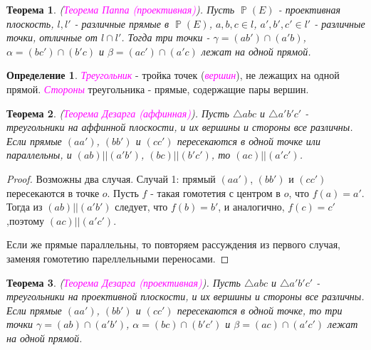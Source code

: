 \documentclass[a4paper,100pt]{article}
\theoremstyle{indented}
\newtheorem{theorem}{Теорема}
\theoremstyle{definition}
\newtheorem{defn}{Определение}
\theoremstyle{remark}
\DeclareMathOperator{\PP}{\mathbb{P}}
\begin{document}
\begin{theorem}
    (\textit{\textcolor{magenta}{\hypertarget{s47}{Теорема Паппа (проективная)}}}). Пусть $\PP(E)$ - проективная плоскость, $l, l'$ - различные прямые в $\PP(E)$, $a, b, c\in l$, $a', b', c'\in l'$ - различные точки, отличные от $l \cap l'$. Тогда три точки - $\gamma = (ab')\cap(a'b)$, $\alpha=(bc')\cap (b'c)$ и $\beta = (ac')\cap (a'c)$ лежат на одной прямой.
\end{theorem}

\begin{defn}
    \textit{\textcolor{magenta}{\hypertarget{s48}{Треугольник}}} - тройка точек (\textit{\textcolor{magenta}{\hypertarget{s49}{вершин}}}), не лежащих на одной прямой. \textit{\textcolor{magenta}{\hypertarget{s50}{Стороны}}} треугольника - прямые, содержащие пары вершин.
\end{defn}

\begin{theorem}
    (\textit{\textcolor{magenta}{\hypertarget{s51}{Теорема Дезарга (аффинная)}}}). Пусть $\triangle abc$ и $\triangle a'b'c'$ - треугольники на аффинной плоскости, и их вершины и стороны все различны. Если прямые $(aa')$, $(bb')$ и $(cc')$ пересекаются в одной точке или параллельны, и $(ab)||(a'b')$, $(bc)||(b'c')$, то $(ac)||(a'c')$. 
\end{theorem} 

\begin{proof}
    Возможны два случая. Случай 1: прямый $(aa')$, $(bb')$ и $(cc')$ пересекаются в точке $o$. Пусть $f$ - такая гомотетия с центром в $o$, что $f(a) = a'$. Тогда из $(ab) || (a'b')$ следует, что $f(b) = b'$, и аналогично, $f(c) = c'$,поэтому $(ac) || (a'c')$. \ 

    Если же прямые параллельны, то повторяем рассуждения из первого случая, заменяя гомотетию пареллельными переносами.
\end{proof}

\begin{theorem}
    (\textit{\textcolor{magenta}{\hypertarget{s52}{Теорема Дезарга (проективная)}}}). Пусть $\triangle abc$ и $\triangle a'b'c'$ - треугольники на проективной плоскости, и их вершины и стороны все различны. Если прямые $(aa')$, $(bb')$ и $(cc')$ пересекаются в одной точке, то три точки $\gamma = (ab)\cap (a'b')$, $\alpha = (bc)\cap (b'c')$ и $\beta = (ac)\cap (a'c')$ лежат на одной прямой.
\end{theorem}
\end{document}
